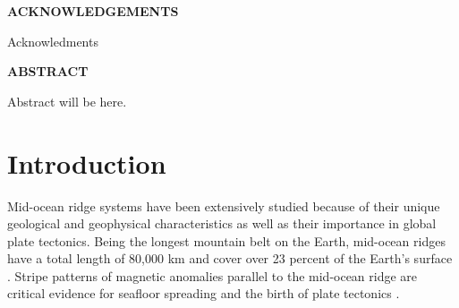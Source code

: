 \documentclass[letterpaper,12pt,notitle]{memphisthesis}                     %
\begin{document}



\doublespacing
{}

\setcounter{page}{2}

\begin{center}
	\textbf{ACKNOWLEDGEMENTS}
\end{center}
\vspace{-0.15in}

Acknowledments~

\newpage
\begin{center}
	\textbf{ABSTRACT}
\end{center}
\vspace{-0.15in}

\thispagestyle{plain}

 Abstract will be here.

\newpage

\begin{singlespace}
	\tableofcontents
\end{singlespace}

\newpage



\begin{singlespace}
	\listoffigures
\end{singlespace}

\newpage


\chapter{Introduction}
\setcounter{section}{0}
\setcounter{subsection}{0}

Mid-ocean ridge systems have been extensively studied because of their unique geological and geophysical characteristics as well as their importance in global plate tectonics. Being the longest mountain belt on the Earth, mid-ocean ridges have a total length of 80,000 km and cover over 23 percent of the Earth’s surface \citep{Peltier1989}. Stripe patterns of magnetic anomalies parallel to the mid-ocean ridge are critical evidence for seafloor spreading and the birth of plate tectonics \citep{Hess1964}.
\end{document}
